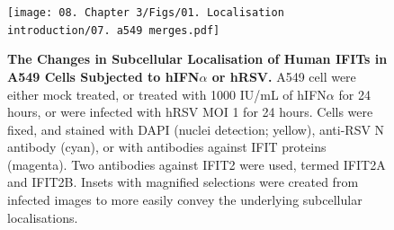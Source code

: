 \begin{figure}
    \centering
    \texttt{[image: 08. Chapter 3/Figs/01. Localisation introduction/07. a549 merges.pdf]}
    \caption[The Changes in Subcellular Localisation of Human IFITs in A549 Cells Subjected to hIFN\(\alpha\) or hRSV.]{\textbf{The Changes in Subcellular Localisation of Human IFITs in A549 Cells Subjected to hIFN\(\alpha\) or hRSV.} A549 cell were either mock treated, or treated with 1000 IU/mL of hIFN\(\alpha\) for 24 hours, or were infected with hRSV MOI 1 for 24 hours. Cells were fixed, and stained with DAPI (nuclei detection; yellow), anti-RSV N antibody (cyan), or with antibodies against IFIT proteins (magenta). Two antibodies against IFIT2 were used, termed IFIT2A and IFIT2B. Insets with magnified selections were created from infected images to more easily convey the underlying subcellular localisations.}
    \label{fig:The Changes in Subcellular Localisation of Human IFITs in A549 Cells Subjected to hIFNa or hRSV}
\end{figure}


